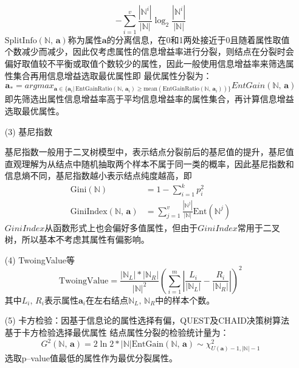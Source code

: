 \documentclass[a4paper]{article}
\begin{document}
\begin{itemize}
$${							   -\sum_{i=1}^{v}\frac{|\mathbb{N}^{i}|}{|\mathbb{N}|}\log_2\frac{|\mathbb{N}^{i}|}{|\mathbb{N}|}}$$
						$\text{SplitInfo}(\mathbb{N},\,\textbf{a})$称为属性$\textbf{a}$的分离信息，在0和1两处接近于0且随着属性取值个数减少而减少，因此仅考虑属性的信息增益率进行分裂，则结点在分裂时会偏好取值较不平衡或取值个数较少的属性，因此一般使用信息增益率来筛选属性集合再用信息增益选取最优属性即
						最优属性分裂为：
						$$\textbf{a}_* = argmax_{\textbf{a}\in\{\textbf{a}_i|\,\text{EntGainRatio}(\mathbb{N},\,\textbf{a}_i)\geq 
										\text{mean}(\text{EntGainRatio}(\mathbb{N},\,\textbf{a}_i))\}}EntGain(\mathbb{N},\,\textbf{a})$$
						即先筛选出属性信息增益率高于平均信息增益率的属性集合，再计算信息增益选取最优属性。
					\item[(3)] 	基尼指数\par
						基尼指数一般用于二叉树模型中，表示结点分裂前后的基尼值的提升，基尼值直观理解为从结点中随机抽取两个样本不属于同一类的概率，因此基尼指数和信息熵不同，基尼指数越小表示结点纯度越高，即
						\begin{align*}
							   \text{Gini}(\mathbb{N}) &= 1 - \sum_{i=1}^{k}p_i^2\\
							   \text{GiniIndex}(\mathbb{N},\, \textbf{a}) &= \sum_{j=1}^{v}\frac{|\mathbb{N}^{j}|}{|\mathbb{N}|}\text{Ent}(\mathbb{N}^{j})		      
						\end{align*}
						$GiniIndex$从函数形式上也会偏好多值属性，但由于$GiniIndex$常用于二叉树，所以基本不考虑其属性有偏影响。
					\item[(4)] 	TwoingValue等\\
						$$\text{TwoingValue} = \frac{|\mathbb{N}_L|*|\mathbb{N}_R|}{|\mathbb{N}|^2}\left(\sum_{i=1}^{m}\left|\frac{L_i}{|\mathbb{N}_L|}-\frac{R_i}{|\mathbb{N}_R|}\right|\right)^2$$
						其中$L_i,\,R_i$表示属性$\textbf{a}_i$在左右结点$\mathbb{N}_L,\,\mathbb{N}_R$中的样本个数。
					\item[(5)] 	卡方检验：因基于信息论的属性选择有偏，QUEST及CHAID决策树算法基于卡方检验选择最优属性
						结点属性分裂的检验统计量为：
						$$G^2(\mathbb{N},\,\textbf{a}) = 2\ln2*|\mathbb{N}|\text{EntGain}(\mathbb{N},\,\textbf{a})\sim \chi_{U(\textbf{a})-1,|\mathbb{N}|-1}^2$$
						选取p--value值最低的属性作为最优分裂属性。
			    \end{itemize}
\end{document}
